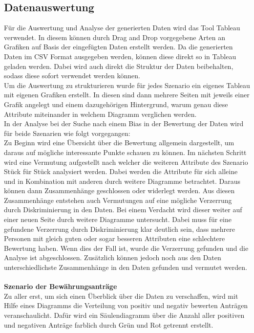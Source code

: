\begin{onehalfspace}
\section{Datenauswertung}
\label{datenauswerung}
Für die Auswertung und Analyse der generierten Daten wird das Tool Tableau verwendet. In diesem können durch Drag and Drop vorgegebene Arten an Grafiken auf Basis der eingefügten Daten erstellt werden. Da die generierten Daten im CSV Format ausgegeben werden, können diese direkt so in Tableau geladen werden. Dabei wird auch direkt die Struktur der Daten beibehalten, sodass diese sofort verwendet werden können.\\
Um die Auswertung zu strukturieren wurde für jedes Szenario ein eigenes Tableau mit eigenen Grafiken erstellt. In diesen sind dann mehrere Seiten mit jeweils einer Grafik angelegt und einem dazugehörigen Hintergrund, warum genau diese Attribute miteinander in welchem Diagramm verglichen werden.\\
In der Analyse bei der Suche nach einem Bias in der Bewertung der Daten wird für beide Szenarien wie folgt vorgegangen:\\
Zu Beginn wird eine Übersicht über die Bewertung allgemein dargestellt, um daraus auf mögliche interessante Punkte schauen zu können. Im nächsten Schritt wird eine Vermutung aufgestellt nach welcher die weiteren Attribute des Szenario Stück für Stück analysiert werden. Dabei werden die Attribute für sich alleine und in Kombination mit anderen durch weitere Diagramme betrachtet. Daraus können dann Zusammenhänge geschlossen oder widerlegt werden. Aus diesen Zusammenhänge entstehen auch Vermutungen auf eine mögliche Verzerrung durch Diskriminierung in den Daten. Bei einem Verdacht wird dieser weiter auf einer neuen Seite durch weitere Diagramme untersucht. Dabei muss für eine gefundene Verzerrung durch Diskriminierung klar deutlich sein, dass mehrere Personen mit gleich guten oder sogar besseren Attributen eine schlechtere Bewertung haben. Wenn dies der Fall ist, wurde die Verzerrung gefunden und die Analyse ist abgeschlossen. Zusätzlich können jedoch noch aus den Daten unterschiedlichste Zusammenhänge in den Daten gefunden und vermutet werden.\\\\
\textbf{Szenario der Bewährungsanträge}\\
Zu aller erst, um sich einen Überblick über die Daten zu verschaffen, wird mit Hilfe eines Diagramms die Verteilung von positiv und negativ bewerten Anträgen veranschaulicht. Dafür wird ein Säulendiagramm über die Anzahl aller positiven und negativen Anträge farblich durch Grün und Rot getrennt erstellt.\\

\end{onehalfspace}
